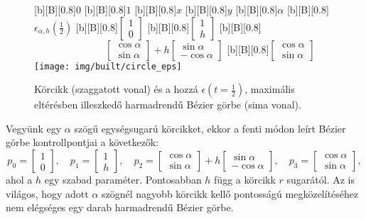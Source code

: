 \documentclass[12pt]{report}
\theoremstyle{definition}
\begin{document}
  \begin{figure}[!htb]
  [b][B][0.8]{\bf{$0$}}
  [b][B][0.8]{\bf{$1$}}
  [b][B][0.8]{\bf{$x$}}
  [b][B][0.8]{\bf{$y$}}
  [b][B][0.8]{\bf{$\alpha$}}
  [b][B][0.8]{\bf{$\epsilon_{\alpha,h}(\frac{1}{2})$}\qquad}
  [b][B][0.8]{\bf{$\begin{bmatrix} 1 \\ 0 \end{bmatrix}$}}
  [b][B][0.8]{\bf{$\begin{bmatrix} 1 \\ h \end{bmatrix}$}}
  [b][B][0.8]{\bf{$\hspace{3cm}\begin{bmatrix} \cos\alpha \\ \sin\alpha
                              \end{bmatrix} + h \begin{bmatrix} \sin\alpha \\
                              -\cos\alpha \end{bmatrix}$}}
  [b][B][0.8]{\bf{$\begin{bmatrix} \cos\alpha \\ \sin\alpha
                              \end{bmatrix}$}}
    \centering
    \texttt{[image: img/built/circle\_eps]}
    \caption{\label{circle} Körcikk (szaggatott vonal) és a hozzá
    $\epsilon(t=\frac{1}{2})$, maximális eltérésben illeszkedő harmadrendű
    Bézier görbe (sima vonal).}
  \end{figure}

Vegyünk egy $\alpha$ szögű egységsugarú körcikket, ekkor a fenti módon leírt
Bézier görbe kontrollpontjai a következők:
\[p_0 = \begin{bmatrix} 1 \\ 0 \end{bmatrix},\quad
  p_1 = \begin{bmatrix} 1 \\ h \end{bmatrix},\quad
  p_2 = \begin{bmatrix} \cos\alpha \\ \sin\alpha \end{bmatrix} + h
        \begin{bmatrix} \sin\alpha \\ -\cos\alpha \end{bmatrix},\quad
  p_3 = \begin{bmatrix} \cos\alpha \\ \sin\alpha \end{bmatrix}, \]
ahol a $h$ egy szabad paraméter. Pontosabban $h$ függ a körcikk $r$ sugarától.
Az is világos, hogy adott $\alpha$ szögnél nagyobb körcikk kellő pontosságú
megközelítéséhez nem elégséges egy darab harmadrendű Bézier görbe.
\end{document}
